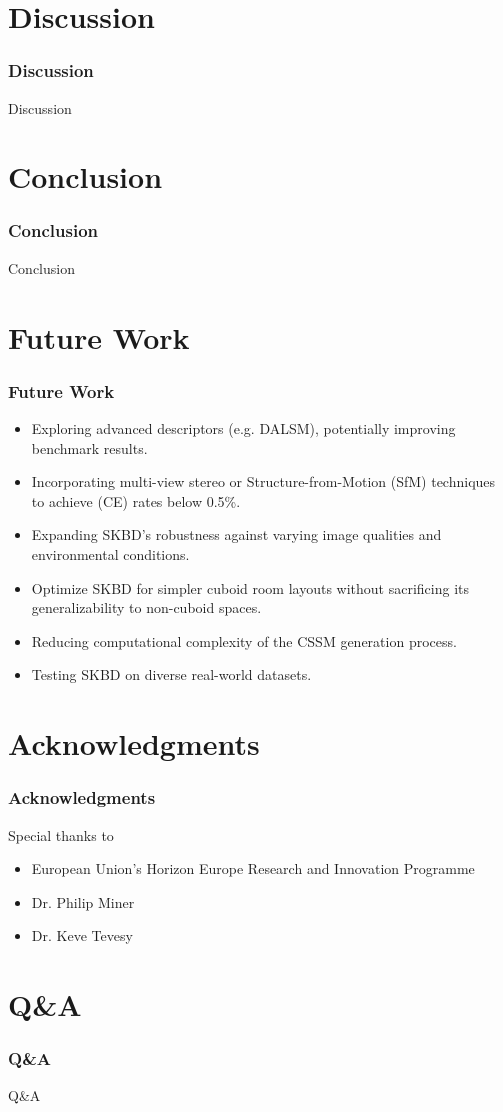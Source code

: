 \documentclass{beamer}
\begin{document}
\section{Discussion}
\begin{frame}
\frametitle{Discussion}
Discussion
\end{frame}

\section{Conclusion}
\begin{frame}
\frametitle{Conclusion}
Conclusion
\end{frame}

\section{Future Work}
\begin{frame}
\frametitle{Future Work}
\begin{itemize}
    \item Exploring advanced descriptors (e.g. DALSM), potentially improving benchmark results.
    \item Incorporating multi-view stereo or Structure-from-Motion (SfM) techniques to achieve (CE) rates below 0.5\%.
    \item Expanding SKBD’s robustness against varying image qualities and environmental conditions. 
    \item Optimize SKBD for simpler cuboid room layouts without sacrificing its generalizability to non-cuboid spaces.
    \item Reducing computational complexity of the CSSM generation process.
    \item Testing SKBD on diverse real-world datasets.
\end{itemize}
\end{frame}

\section{Acknowledgments}
\begin{frame}
\frametitle{Acknowledgments}
Special thanks to
\begin{itemize}
    \item European Union's Horizon Europe Research and Innovation Programme
    \item Dr. Philip Miner
    \item Dr. Keve Tevesy
\end{itemize}
\end{frame}

\section{Q\&A}
\begin{frame}
\frametitle{Q\&A}
Q\&A
\end{frame}
\end{document}
